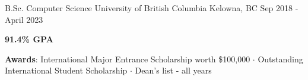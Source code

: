 

\begin{cventries}


  \cventry
    {B.Sc. Computer Science} %
    {University of British Columbia} %
    {Kelowna, BC} %
    {Sep 2018 - April 2023} %
    {
      \begin{cvitems} %
        \item {\textbf{91.4\% GPA}}
        \item {\textbf{Awards}: International Major Entrance Scholarship worth \$100,000 $\cdot$ Outstanding International Student Scholarship $\cdot$ Dean's list - all years}  
      \end{cvitems} 
    }

\end{cventries}



